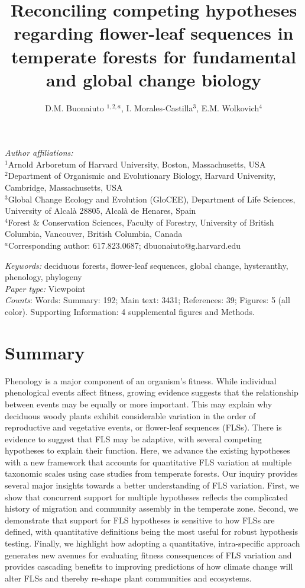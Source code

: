 \documentclass[11pt]{article}
\title{Reconciling competing hypotheses regarding flower-leaf sequences in temperate forests for fundamental and global change biology}
\date{}
\author{D.M. Buonaiuto $^{1,2,a}$, I. Morales-Castilla$^{3}$, E.M. Wolkovich$^{4}$}
\begin{document}
\maketitle
\linenumbers
\noindent \emph{Author affiliations:}\\
\noindent $^1$Arnold Arboretum of Harvard University, Boston, Massachusetts, USA\\
$^2$Department of Organismic and Evolutionary Biology, Harvard University, Cambridge, Massachusetts, USA\\
$^3$Global Change Ecology and Evolution (GloCEE), Department of Life Sciences, University of Alcal\`a  28805, Alcal\`a de Henares, Spain\\
$^4$Forest \& Conservation Sciences, Faculty of Forestry, University of British Columbia, Vancouver, British Columbia, Canada\\
$^a$Corresponding author: 617.823.0687; dbuonaiuto@g.harvard.edu

\noindent \emph{Keywords:} deciduous forests, flower-leaf sequences, global change, hysteranthy, phenology, phylogeny \\ %
\emph{Paper type:} Viewpoint\\
\emph{Counts}: Words: Summary: 192; Main text: 3431; References: 39;  Figures: 5 (all color). Supporting Information: 4 supplemental figures and Methods.
\newpage

\section*{Summary}
Phenology is a major component of an organism's fitness. While individual phenological events affect fitness, growing evidence suggests that the relationship between events may be equally or more important. This may explain why deciduous woody plants exhibit considerable variation in the order of reproductive and vegetative events, or flower-leaf sequences (FLSs). There is evidence to suggest that FLS may be adaptive, with several competing hypotheses to explain their function. Here, we advance the existing hypotheses with a new framework that accounts for quantitative FLS variation at multiple taxonomic scales using case studies from temperate forests. Our inquiry provides several major insights towards a better understanding of FLS variation. First, we show that concurrent support for multiple hypotheses reflects the complicated history of migration and community assembly in the temperate zone. Second, we demonstrate that support for FLS hypotheses is sensitive to how FLSs are defined, with quantitative definitions being the most useful for robust hypothesis testing. Finally, we highlight how adopting a quantitative, intra-specific approach generates new avenues for evaluating fitness consequences of FLS variation and provides cascading benefits to improving predictions of how climate change will alter FLSs and thereby re-shape plant communities and ecosystems.
\end{document}
